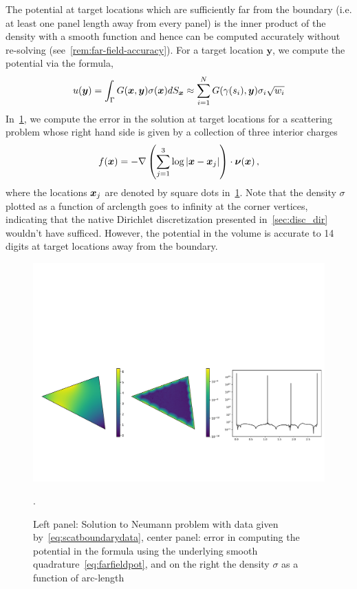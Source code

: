 The potential at target locations which are sufficiently far from the boundary (i.e. at least one panel length away from 
every panel) is the inner product of the 
density with a smooth function and hence can be computed accurately without re-solving (see~\cref{rem:far-field-accuracy}). For a target 
location $\boldsymbol{y}$, we compute the potential via the formula,
\begin{equation}
\label{eq:farfieldpot}
u(\boldsymbol{y}) = \int_{\Gamma} G(\boldsymbol{x},\boldsymbol{y}) \sigma(\boldsymbol{x}) dS_{\boldsymbol{x}} \approx \sum_{i=1}^{N}  G(\gamma(s_{i}),\boldsymbol{y}) \sigma_{i} \sqrt{w_{i}}
\end{equation}
In~\cref{fig:scatteringtest}, we compute the error in the solution at target
locations for a scattering problem whose right hand side is given by a collection of three interior charges
\begin{equation}
\label{eq:scatboundarydata}
f(\boldsymbol{x}) = -\nabla  \left(\sum_{j=1}^{3} \log |\boldsymbol{x} - \boldsymbol{x}_{j}|  \right)  \cdot \boldsymbol{\nu}(\boldsymbol{x})\, ,  
\end{equation}
where the locations $\boldsymbol{x}_{j}$ are denoted by square dots in~\cref{fig:scatteringtest}. Note that the density $\sigma$ plotted
as a function of arclength goes to infinity at the corner vertices, indicating that the native Dirichlet discretization 
presented in~\cref{sec:disc_dir} wouldn't have sufficed. However, the potential in the volume is accurate to 14 digits at
target locations away from the boundary. 
\begin{figure}
\begin{center}
\includegraphics[width=\linewidth]{media/weaktest}
\caption{Left panel: Solution to Neumann problem with data given by~\cref{eq:scatboundarydata}, center panel: error in computing the potential in the formula using the underlying smooth quadrature~\cref{eq:farfieldpot}, and on the right the density $\sigma$ as a function of arc-length}.
\label{fig:scatteringtest}
\end{center}
\end{figure}


